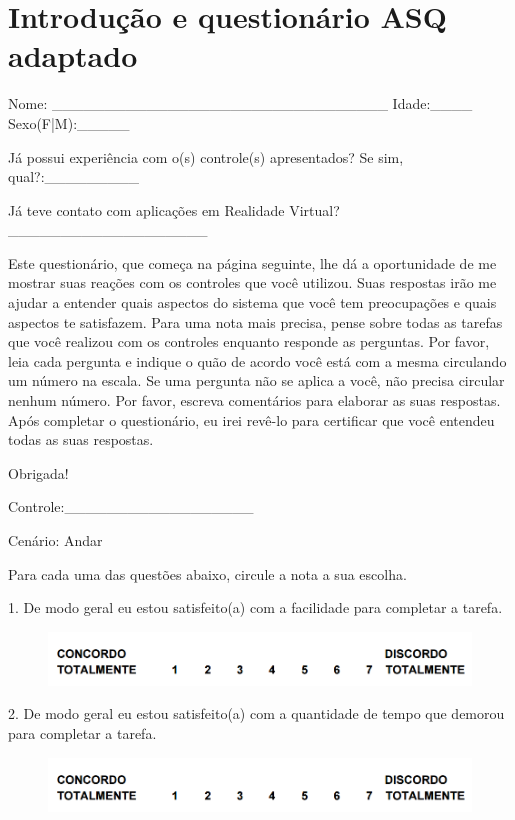 \chapter{Introdução e questionário ASQ adaptado}
\label{a.apendice1}

\begin{flushleft}
Nome: \_\_\_\_\_\_\_\_\_\_\_\_\_\_\_\_\_\_\_\_\_\_\_\_\_\_\_\_\_\_\_\_ Idade:\_\_\_\_ Sexo(F|M):\_\_\_\_\_

Já possui experiência com o(s) controle(s) apresentados? Se sim, qual?:\_\_\_\_\_\_\_\_\_

Já teve contato com aplicações em Realidade Virtual?\_\_\_\_\_\_\_\_\_\_\_\_\_\_\_\_\_\_\_

Este questionário, que começa na página seguinte, lhe dá a oportunidade de me mostrar
suas reações com os controles que você utilizou. Suas respostas irão me ajudar a entender
quais aspectos do sistema que você tem preocupações e quais aspectos te satisfazem.
Para uma nota mais precisa, pense sobre todas as tarefas que você realizou com os
controles enquanto responde as perguntas.
Por favor, leia cada pergunta e indique o quão de acordo você está com a mesma
circulando um número na escala. Se uma pergunta não se aplica a você, não precisa
circular nenhum número.
Por favor, escreva comentários para elaborar as suas respostas.
Após completar o questionário, eu irei revê-lo para certificar que você entendeu todas as
suas respostas.

Obrigada!	

\newpage
Controle:\_\_\_\_\_\_\_\_\_\_\_\_\_\_\_\_\_\_

Cenário: Andar

Para cada uma das questões abaixo, circule a nota a sua escolha.

1. De modo geral eu estou satisfeito(a) com a facilidade para completar a tarefa.
\begin{figure}[H]	
	\centering
	\includegraphics[scale=0.6]{Imagens/questionarios.png}
	\label{f.questionarios}
\end{figure}

2. De modo geral eu estou satisfeito(a) com a quantidade de tempo que demorou para
completar a tarefa.
\begin{figure}[H]	
	\centering
	\includegraphics[scale=0.6]{Imagens/questionarios.png}
	\label{f.questionarios}
\end{figure}


\end{flushleft}
